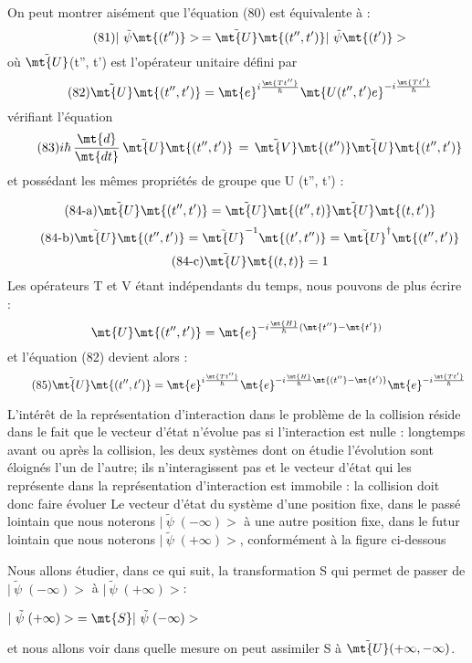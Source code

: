 On peut montrer aisément que l'équation (80) est équivalente à :
\[
\tag{81}|\ \tilde{\psi}\mt{(t'')}>\,=\tilde{\mt{U}}\mt{(t'', t') }|\ \tilde{\psi}\mt{(t')}>
\]
où $\tilde{\mt{U}}$(t'', t') est l'opérateur unitaire défini par
\[
\tag{82}\tilde{\mt{U}}\mt{(t'', t')}=
\mt{e}^{i\frac{\mt{Tt''}}{\hbar}}\mt{ U(t'', t') e}^{-i\frac{\mt{Tt'}}{\hbar}}
\]
vérifiant l'équation
\[
\tag{83}i\hbar\,\frac{\mt{d}}{\mt{dt}}\,\tilde{\mt{U}}\mt{(t'', t')}\,=
\,\tilde{\mt{V}}\mt{(t'') }\tilde{\mt{U}}\mt{(t'', t')}
\]
et possédant les mêmes propriétés de groupe que U (t'', t') :

\[
\tag{84-a}\tilde{\mt{U}}\mt{(t'', t')}=\tilde{\mt{U}}\mt{(t'', t)}\tilde{\mt{U}}\mt{(t, t')}
\]
\[
\tag{84-b}\tilde{\mt{U}}\mt{(t'', t')}=\tilde{\mt{U}}^{-1}\mt{(t', t'')}=\tilde{\mt{U}}^\dag\mt{(t'', t')}
\]
\[
\tag{84-c}\tilde{\mt{U}}\mt{(t, t)}=1
\]
Les opérateurs T et V étant indépendants du temps, nous pouvons de plus écrire :
\[
\mt{U}\mt{(t'', t')}=\mt{e}^{-i\frac{\mt{H}}{\hbar}(\mt{t''}-\mt{t'})}
\]
et l'équation (82) devient alors :
\[
\tag{85}\tilde{\mt{U}}\mt{(t'', t')}=
\mt{e}^{i\frac{\mt{Tt''}}{\hbar}}\mt{e}^{-i\frac{\mt{H}}{\hbar}\mt{(t''}-\mt{t')}}\mt{e}^{-i\frac{\mt{Tt'}}{\hbar}}
\]

L'intérêt de la représentation d'interaction dans le problème de la collision
réside dans le fait que le vecteur d'état n'évolue
pas si l'interaction est nulle : longtemps avant ou après la collision,
les deux systèmes dont on étudie l'évolution sont éloignés l'un de
l'autre; ils n'interagissent pas et le vecteur d'état qui les représente dans
la représentation d'interaction est immobile : la collision
doit donc faire évoluer Le vecteur d'état du système d'une position
fixe, dans le passé lointain que nous noterons $|\ \tilde{\psi}\;(-\infty)>$ à une
autre position fixe, dans le futur lointain que nous noterons $|\ \tilde{\psi}\;(+\infty)>$,
conformément à la figure ci-dessous
\begin{center}  \end{center}
Nous allons étudier, dans ce qui suit, la transformation S qui permet de
passer de $|\ \tilde{\psi}\;(-\infty)>$ à $|\ \tilde{\psi}\;(+\infty)>$:
\begin{center}
$|\ \tilde{\psi}\;(+\infty)>\;=\mt{S }|\ \tilde{\psi}\;(-\infty)>$
\end{center}
et nous allons voir dans quelle mesure on peut assimiler S à $\tilde{\mt{U}}(+\infty,-\infty)$.

